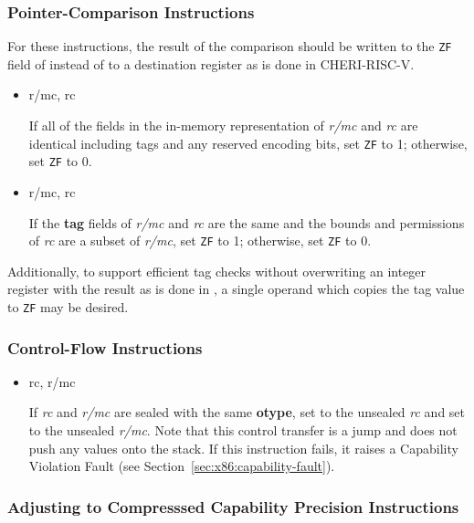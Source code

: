 \subsubsection{Pointer-Comparison Instructions}

For these instructions, the result of the comparison should be written
to the \texttt{ZF} field of \RFLAGS{} instead of to a destination
register as is done in CHERI-RISC-V.

\begin{itemize}
  \item {} r/mc, rc

    If all of the fields in the in-memory representation of
    \emph{r/mc} and \emph{rc} are identical including tags and any
    reserved encoding bits, set \texttt{ZF} to 1; otherwise, set
    \texttt{ZF} to 0.

  \item {} r/mc, rc

    If the \textbf{tag} fields of \emph{r/mc} and \emph{rc} are the
    same and the bounds and permissions of \emph{rc} are a subset of
    \emph{r/mc}, set \texttt{ZF} to 1; otherwise, set \texttt{ZF} to
    0.
\end{itemize}

Additionally, to support efficient tag checks without overwriting an
integer register with the result as is done in , a
single operand  which copies the tag value to
\texttt{ZF} may be desired.

\subsubsection{Control-Flow Instructions}

\begin{itemize}
  \item {} rc, r/mc

    If \emph{rc} and \emph{r/mc} are sealed with the same
    \textbf{otype}, set \CIP{} to the unsealed \emph{rc} and set
    \CAX{} to the unsealed \emph{r/mc}.  Note that this control
    transfer is a jump and does not push any values onto the stack.
    If this instruction fails, it raises a Capability Violation Fault
    (see Section~\ref{sec:x86:capability-fault}).
\end{itemize}

\subsubsection{Adjusting to Compresssed Capability Precision
  Instructions}

